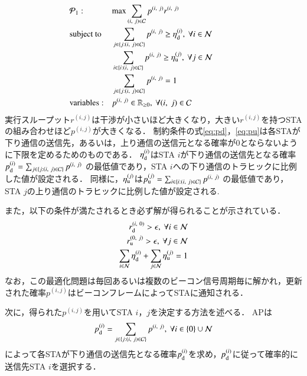 \documentclass[master]{kuisthesis}		%
\newcommand{\sij}{(i,j)}
\newcommand{\mN}{{\mathcal N}}
\newcommand{\pij}{p^{(i,j)}}
\newcommand{\rij}{r^{\sij}}
\begin{document}
			\begin{align}
				&{\mathcal P}_1: && {\rm max} \sum_{(i,\ j)\in{\mathcal C}} p^{(i,\ j)}r^{(i,\ j)} &&&&&& \label{eq:p1}\\
				&{\rm subject\ to} && \sum_{j\in\{j:(i,\ j)\in{\mathcal C}\}} p^{(i,\ j)} \geq \eta_{\rm d}^{(i)},\ \forall i\in {\mathcal N} \label{eq:pd} \\
				&&& \sum_{i\in\{i:(i,\ j)\in{\mathcal C}\}} p^{(i,\ j)} \geq \eta_{\rm u}^{(j)},\ \forall j\in {\mathcal N} \label{eq:pu}\\
				&&& \sum_{j\in\{j:(i,\ j)\in{\mathcal C}\}} p^{(i,\ j)}=1 \\
				&{\rm variables:} &&p^{(i,\ j)} \in {\mathbb R}_{\geq 0},\ \forall(i,\ j)\in {\mathcal C} \nonumber
			\end{align}
			実行スループット$\rij$は干渉が小さいほど大きくなり，大きい$\rij$を持つSTAの組み合わせほど$p^{\sij}$が大きくなる．
			制約条件の式\eqref{eq:pd}，\eqref{eq:pu}は各STAが下り通信の送信先，あるいは，上り通信の送信元となる確率が0とならないように下限を定めるためのものである．
			$\eta_{\rm d}^{(i)}$はSTA $i$が下り通信の送信先となる確率$p_{\rm d}^{(i)}=\sum_{j\in\{j:(i,\ j)\in{\mathcal C}\}} p^{(i,\ j)}$
			の最低値であり，STA $i$への下り通信のトラヒックに比例した値が設定される．
			同様に，$\eta_{\rm u}^{(j)}$は$p_{\rm u}^{(j)}=\sum_{i\in\{i:(i,\ j)\in{\mathcal C}\}} p^{(i,\ j)}$
			の最低値であり，STA $j$の上り通信のトラヒックに比例した値が設定される.
			\par
			また，以下の条件が満たされるとき必ず解が得られることが示されている．
			\begin{align}
				r_{\rm d}^{(i,\ 0)} >\epsilon,\ \forall i\in\mN \\
				r_{\rm u}^{(0,\ j)} >\epsilon,\ \forall j\in\mN \\
				\sum_{i\in\mN}\eta_{\rm d}^{(i)} + \sum_{j\in\mN}\eta_{\rm u}^{(j)} =1 \label{eq:feasible}
			\end{align}
			なお，この最適化問題は毎回あるいは複数のビーコン信号周期毎に解かれ，更新された確率$\pij$はビーコンフレームによってSTAに通知される．
			\par
			次に，得られた$\pij$を用いてSTA $i$，$j$を決定する方法を述べる．
			APは
			\begin{equation}
				p_{\rm d}^{(i)}= \sum_{j\in\{j:(i,\ j)\in{\mathcal C}\}}p^{(i,\ j)},\ \forall i \in \{0\}\cup{\mathcal N}
			\end{equation}
			によって各STAが下り通信の送信先となる確率$p_{\rm d}^{(i)}$を求め，$p_{\rm d}^{(i)}$に従って確率的に送信先STA $i$を選択する．
\end{document}
